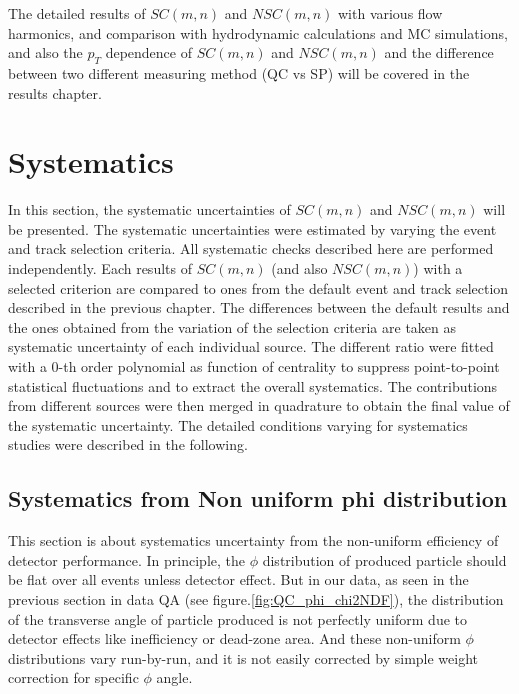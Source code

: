 \vskip15mm

The detailed results of $SC(m,n)$ and  $NSC(m,n)$ with various flow harmonics, and comparison with hydrodynamic calculations and MC simulations, and also the $p_T$ dependence of $SC(m,n)$ and $NSC(m,n)$ and the difference between two different measuring method (QC vs SP) will be covered in the results chapter.

\section{Systematics}

	In this section, the systematic uncertainties of $SC(m,n)$ and  $NSC(m,n)$ will be presented. The systematic uncertainties were estimated by varying the event and track selection criteria. All systematic checks described here are performed independently. Each results of $SC(m,n)$ (and also $NSC(m,n)$) with a selected criterion are compared to ones from the default event and track selection described in the previous chapter. The differences between the default results and the ones obtained from the variation of the selection criteria are taken as systematic uncertainty of each individual source.
The different ratio were fitted with a 0-th order polynomial as function of centrality to suppress point-to-point statistical fluctuations and to extract the overall systematics. The contributions from different sources were then merged in quadrature to obtain the final value of the systematic uncertainty. The detailed conditions varying for systematics studies were described in the following.
	
	
	
\subsection{Systematics from Non uniform phi distribution}
	
	
This section is about systematics uncertainty from the non-uniform efficiency of detector performance. In principle, the $\phi$ distribution of produced particle should be flat over all events unless detector effect. But in our data, as seen in the previous section in data QA (see figure.\ref{fig:QC_phi_chi2NDF}), the distribution of the transverse angle of particle produced is not perfectly uniform due to detector effects like inefficiency or dead-zone area. And these non-uniform $\phi$ distributions vary run-by-run, and it is not easily corrected by simple weight correction for specific $\phi$ angle.

